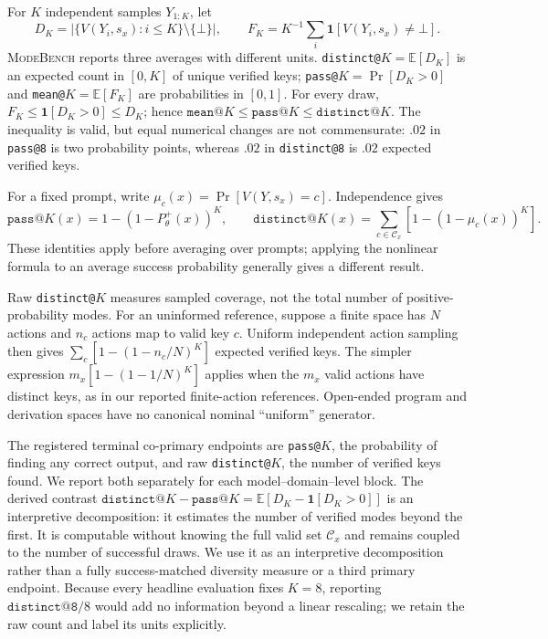 \documentclass{article}
\newcommand{\1}{\mathbf 1}
\newcommand{\E}{\mathbb E}
\newcommand{\mb}{\textsc{ModeBench}}
\theoremstyle{remark}
\theoremstyle{definition}
\theoremstyle{plain}
\begin{document}
For $K$ independent samples $Y_{1:K}$, let
\[
  D_K=\bigl|\{V(Y_i,s_x):i\le K\}\setminus\{\bot\}\bigr|,
  \qquad
  F_K=K^{-1}\sum_i \1[V(Y_i,s_x)\neq\bot].
\]
\mb{} reports three averages with different units. \texttt{distinct@}$K
=\E[D_K]$ is an expected count in $[0,K]$ of unique verified keys;
\texttt{pass@}$K=\Pr[D_K>0]$ and \texttt{mean@}$K=\E[F_K]$ are probabilities
in $[0,1]$. For every draw, $F_K\le\1[D_K>0]\le D_K$; hence
$\texttt{mean@}K\le\texttt{pass@}K\le\texttt{distinct@}K$. The inequality is
valid, but equal numerical changes are not commensurate: $.02$ in
\texttt{pass@8} is two probability points, whereas $.02$ in
\texttt{distinct@8} is $.02$ expected verified keys.

For a fixed prompt, write $\mu_c(x)=\Pr[V(Y,s_x)=c]$. Independence gives
\[
 \texttt{pass@}K(x)=1-(1-P_\theta^+(x))^K,\qquad
 \texttt{distinct@}K(x)=\sum_{c\in\mathcal C_x}[1-(1-\mu_c(x))^K].
\]
These identities apply before averaging over prompts; applying the nonlinear
formula to an average success probability generally gives a different result.

Raw \texttt{distinct@}$K$ measures sampled coverage, not the total number of
positive-probability modes. For an uninformed reference, suppose a finite
space has $N$ actions and $n_c$ actions map to valid key $c$. Uniform independent
action sampling then gives $\sum_c[1-(1-n_c/N)^K]$ expected verified keys.
The simpler expression $m_x[1-(1-1/N)^K]$ applies when the $m_x$ valid actions
have distinct keys, as in our reported finite-action references.
Open-ended program and derivation spaces have no canonical nominal
``uniform'' generator.

The registered terminal co-primary endpoints are \texttt{pass@}$K$, the
probability of finding any correct output, and raw \texttt{distinct@}$K$, the
number of verified keys found. We report both separately for each
model--domain--level block. The derived contrast
$\texttt{distinct@}K-\texttt{pass@}K
=\E[D_K-\1[D_K>0]]$ is an interpretive decomposition: it estimates the
number of verified modes beyond the first. It is computable without knowing the
full valid set $\mathcal C_x$ and remains coupled to the number of successful
draws. We use it as an interpretive decomposition rather than a fully
success-matched diversity measure or a third primary endpoint. Because every
headline evaluation fixes $K=8$, reporting $\texttt{distinct@8}/8$ would add no
information beyond a linear rescaling; we retain the raw count and label its
units explicitly.
\end{document}
